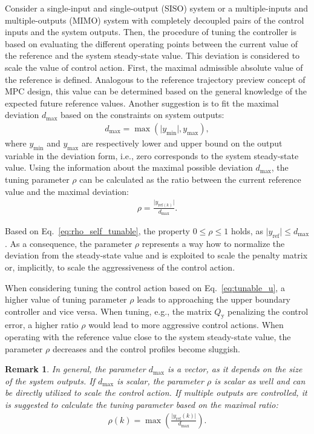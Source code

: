 \documentclass[preprint,12pt]{elsarticle}
\newtheorem{remark}[theorem]{Remark}
\begin{document}
	Consider a single-input and single-output (SISO) system or a multiple-inputs and multiple-outputs (MIMO) system with completely decoupled pairs of the control inputs and the system outputs. 
	Then, the procedure of tuning the controller is based on evaluating the different operating points between the current value of the reference and the system steady-state value. This deviation is considered to scale the value of control action. First, the maximal admissible absolute value of the reference is defined. Analogous to the reference trajectory preview concept of MPC design, this value can be determined based on the general knowledge of the expected future reference values. Another suggestion is to fit the maximal deviation $d_{\max}$ based on the constraints on system outputs: 
	\begin{eqnarray}
		\label{eq:d_max}
		d_{\max} = \max(\vert y_{\min} \vert, y_{\max}),
	\end{eqnarray}
	where $y_{\min}$ and $y_{\max}$ are respectively lower and upper bound on the output variable in the deviation form, i.e., zero corresponds to the system steady-state value. Using the information about the maximal possible deviation $d_{\max}$, the tuning parameter $\rho$ can be calculated as the ratio between the current reference value and the maximal deviation:  
	\begin{eqnarray}
		\label{eq:rho_self_tunable}
		\rho = \frac{\vert y_{\mathrm{ref}(k)} \vert}{d_{\max}}.
	\end{eqnarray}
	
	Based on Eq.~\eqref{eq:rho_self_tunable}, the property $0 \le \rho \le 1$ holds, as $\vert y_{\mathrm{ref}} \vert \le d_{\max}$. As a consequence, the parameter $\rho$ represents a way how to normalize the deviation from the steady-state value and is exploited to scale the penalty matrix or, implicitly, to scale the aggressiveness of the control action. 
	
	When considering tuning the control action based on Eq.~\eqref{eq:tunable_u}, a higher value of tuning parameter $\rho$ leads to approaching the upper boundary controller and vice versa. When tuning, e.g., the matrix $Q_\mathrm{y}$ penalizing the control error, a higher ratio $\rho$ would lead to more aggressive control actions. When operating with the reference value close to the system steady-state value, the parameter $\rho$ decreases and the control profiles become sluggish.
	
	\begin{remark}
		In general, the parameter $d_{\max}$ is a vector, as it depends on the size of the system outputs. If $d_{\max}$ is scalar, the parameter $\rho$ is scalar as well and can be directly utilized to scale the control action. If multiple outputs are controlled, it is suggested to calculate the tuning parameter based on the maximal ratio:
		\begin{eqnarray}
			\label{eq:rho_max}
			\rho(k) = \max \left( \frac{\vert y_{\mathrm{ref}}(k) \vert}{d_{\max}} \right).
		\end{eqnarray}
	\end{remark}
	
\end{document}
